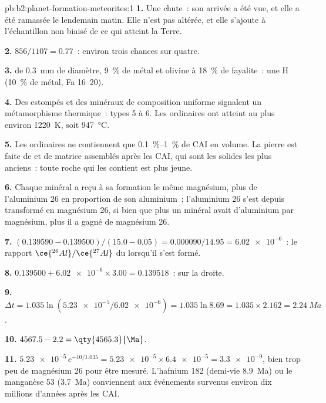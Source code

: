 \begin{solution}{pb:b2:planet-formation-meteorites:1}
\textbf{1.} Une chute~: son arrivée a été vue, et elle a été ramassée le lendemain matin. Elle n'est pas altérée, et elle s'ajoute à
l'échantillon non biaisé de ce qui atteint la Terre.

\textbf{2.} $856/1107 = 0.77$~: environ trois chances sur quatre.

\textbf{3.}  de \qty{0.3}{mm} de diamètre, \qty{9}{\percent} de métal et olivine à \qty{18}{\percent} de fayalite~: une
 H (\qty{10}{\percent} de métal, Fa 16--20).

\textbf{4.} Des  estompés et des minéraux de composition uniforme signalent un
métamorphisme thermique~: types 5 à 6. Les  ordinaires ont atteint au plus environ
\qty{1220}{K}, soit \qty{947}{\degreeCelsius}.

\textbf{5.} Les  ordinaires ne contiennent que \qtyrange{0.1}{1}{\percent} de CAI en volume. La
pierre est faite de  et de matrice assemblés après les CAI, qui sont les solides les plus anciens~:
toute roche qui les contient est plus jeune.

\textbf{6.} Chaque minéral a reçu à sa formation le même magnésium, plus de
l'aluminium 26 en proportion de son aluminium~; l'aluminium 26 s'est depuis
transformé en magnésium 26, si bien que plus un minéral avait d'aluminium par
magnésium, plus il a gagné de magnésium 26.

\textbf{7.} $(0.139590 - 0.139500)/(15.0 - 0.05) = \num{0.000090}/14.95 =
\num{6.02e-6}$~: le rapport $\ce{^{26}Al}/\ce{^{27}Al}$ du  lorsqu'il
s'est formé.

\textbf{8.} $0.139500 + \num{6.02e-6}\times3.00 = 0.139518$~: sur la droite.

\textbf{9.} $\Delta t = 1.035\ln(\num{5.23e-5}/\num{6.02e-6}) = 1.035\ln8.69 =
1.035\times2.162 = \qty{2.24}{Ma}$.

\textbf{10.} $4567.5 - 2.2 = \qty{4565.3}{\Ma}$.

\textbf{11.} $\num{5.23e-5}\,e^{-10/1.035} = \num{5.23e-5}\times\num{6.4e-5} =
\num{3.3e-9}$, bien trop peu de magnésium 26 pour être mesuré. L'hafnium 182 (demi-vie
\qty{8.9}{Ma}) ou le manganèse 53 (\qty{3.7}{Ma}) conviennent aux événements survenus environ dix millions d'années
après les CAI.


\end{solution}

